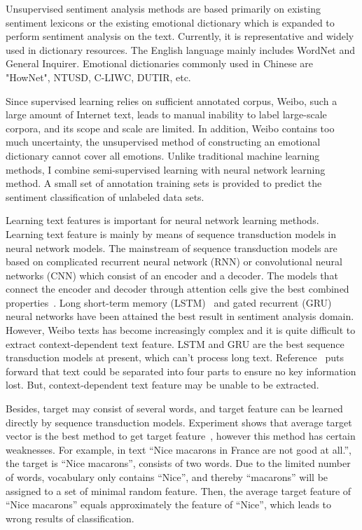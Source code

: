 \documentclass{ieeeaccess}
\begin{document}
Unsupervised sentiment analysis methods are based primarily on existing sentiment lexicons or the existing emotional dictionary which is expanded to perform sentiment analysis on the text. Currently, it is representative and widely used in dictionary resources. The English language mainly includes WordNet and General Inquirer. Emotional dictionaries commonly used in Chinese are "HowNet", NTUSD, C-LIWC, DUTIR, etc.

Since supervised learning relies on sufficient annotated corpus, Weibo, such a large amount of Internet text, leads to manual inability to label large-scale corpora, and its scope and scale are limited. In addition, Weibo contains too much uncertainty, the unsupervised method of constructing an emotional dictionary cannot cover all emotions.  Unlike traditional machine learning methods, I combine semi-supervised learning with neural network learning method. A small set of annotation training sets is provided to predict the sentiment classification of unlabeled data sets.

Learning text features is important for neural network learning methods. Learning text feature is mainly by means of sequence transduction models in neural network models. The mainstream of sequence transduction models are based on complicated recurrent neural network (RNN) or convolutional neural networks (CNN) which consist of an encoder and a decoder. The models that connect the encoder and decoder through attention cells give the best combined properties~\cite{DBLP:conf/nips/VaswaniSPUJGKP17}. Long short-term memory (LSTM)~\cite{DBLP:journals/neco/HochreiterS97} and gated recurrent (GRU)~\cite{DBLP:journals/corr/ChungGCB14} neural networks have been attained the best result in sentiment analysis domain. However, Weibo texts has become increasingly complex and it is quite difficult to extract context-dependent text feature. LSTM and GRU are the best sequence transduction models at present, which can’t process long text. Reference~\cite{DBLP:conf/naacl/SongSLZ18} puts forward that text could be separated into four parts to ensure no key information lost. But, context-dependent text feature may be unable to be extracted.

Besides, target may consist of several words, and target feature can be learned directly by sequence transduction models. Experiment shows that average target vector is the best method to get target feature~\cite{DBLP:journals/eswa/DoPMA19}, however this method has certain weaknesses. For example, in text “Nice macarons in France are not good at all.”, the target is “Nice macarons”, consists of two words. Due to the limited number of words, vocabulary only contains “Nice”, and thereby “macarons” will be assigned to a set of minimal random feature. Then, the average target feature of “Nice macarons” equals approximately the feature of “Nice”, which leads to wrong results of classification.
\end{document}
